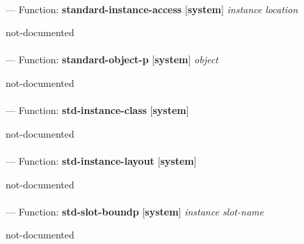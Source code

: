 \paragraph{}
\label{SYSTEM:STANDARD-INSTANCE-ACCESS}
--- Function: \textbf{standard-instance-access} [\textbf{system}] \textit{instance location}

\begin{adjustwidth}{5em}{5em}
not-documented
\end{adjustwidth}

\paragraph{}
\label{SYSTEM:STANDARD-OBJECT-P}
--- Function: \textbf{standard-object-p} [\textbf{system}] \textit{object}

\begin{adjustwidth}{5em}{5em}
not-documented
\end{adjustwidth}

\paragraph{}
\label{SYSTEM:STD-INSTANCE-CLASS}
--- Function: \textbf{std-instance-class} [\textbf{system}] \textit{}

\begin{adjustwidth}{5em}{5em}
not-documented
\end{adjustwidth}

\paragraph{}
\label{SYSTEM:STD-INSTANCE-LAYOUT}
--- Function: \textbf{std-instance-layout} [\textbf{system}] \textit{}

\begin{adjustwidth}{5em}{5em}
not-documented
\end{adjustwidth}

\paragraph{}
\label{SYSTEM:STD-SLOT-BOUNDP}
--- Function: \textbf{std-slot-boundp} [\textbf{system}] \textit{instance slot-name}

\begin{adjustwidth}{5em}{5em}
not-documented
\end{adjustwidth}


